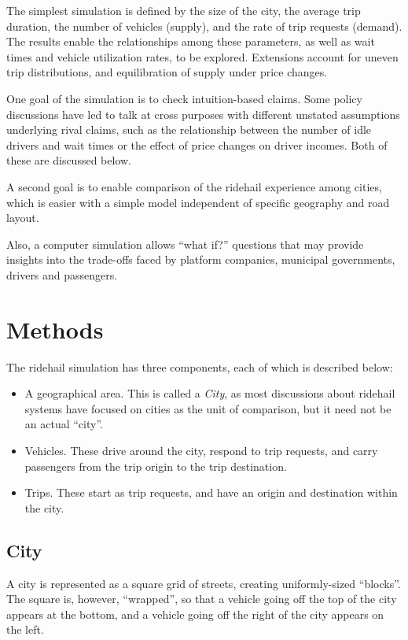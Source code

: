 \documentclass[
  letterpaper,
]{article}
\begin{document}
The simplest simulation is defined by the size of the city, the average
trip duration, the number of vehicles (supply), and the rate of trip
requests (demand). The results enable the relationships among these
parameters, as well as wait times and vehicle utilization rates, to be
explored. Extensions account for uneven trip distributions, and
equilibration of supply under price changes.

One goal of the simulation is to check intuition-based claims. Some
policy discussions have led to talk at cross purposes with different
unstated assumptions underlying rival claims, such as the relationship
between the number of idle drivers and wait times or the effect of price
changes on driver incomes. Both of these are discussed below.

A second goal is to enable comparison of the ridehail experience among
cities, which is easier with a simple model independent of specific
geography and road layout.

Also, a computer simulation allows ``what if?'' questions that may
provide insights into the trade-offs faced by platform companies,
municipal governments, drivers and passengers.

\hypertarget{methods}{%
\section{Methods}\label{methods}}

The ridehail simulation has three components, each of which is described
below:

\begin{itemize}
\item
  A geographical area. This is called a \emph{City}, as most discussions
  about ridehail systems have focused on cities as the unit of
  comparison, but it need not be an actual ``city''.
\item
  Vehicles. These drive around the city, respond to trip requests, and
  carry passengers from the trip origin to the trip destination.
\item
  Trips. These start as trip requests, and have an origin and
  destination within the city.
\end{itemize}

\hypertarget{city}{%
\subsection{City}\label{city}}

A city is represented as a square grid of streets, creating
uniformly-sized ``blocks''. The square is, however, ``wrapped'', so that
a vehicle going off the top of the city appears at the bottom, and a
vehicle going off the right of the city appears on the left.
\end{document}
